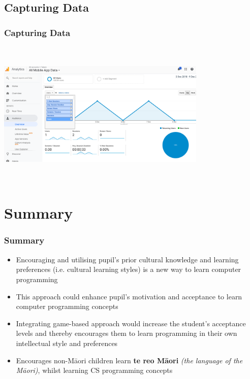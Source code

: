 \documentclass[aspectratio=169]{beamer}
\begin{document}
\subsection{Capturing Data}
\begin{frame}
\frametitle{Capturing Data}

\centering
\includegraphics[width=10cm,height=7cm]{p7.png}\\


\end{frame}


\section{Summary}
\begin{frame}
\frametitle{Summary}

\begin{itemize}
\item  Encouraging and utilising pupil’s prior cultural knowledge and learning preferences (i.e. cultural learning styles) is a new way to learn computer programming 
\newline
\item This approach could enhance pupil's motivation and acceptance to learn computer programming concepts
\newline	
\item Integrating game-based approach would increase the student's acceptance levels and thereby encourages them to learn programming in their own intellectual style and preferences 
\item Encourages non-M\=aori children learn \textbf{te reo M\=aori} \textit{(the language of the M\=aori)},  whilst learning CS programming concepts 
\newline	
\end{itemize}
\end{frame}
\ThankYouFrame
\end{document}
